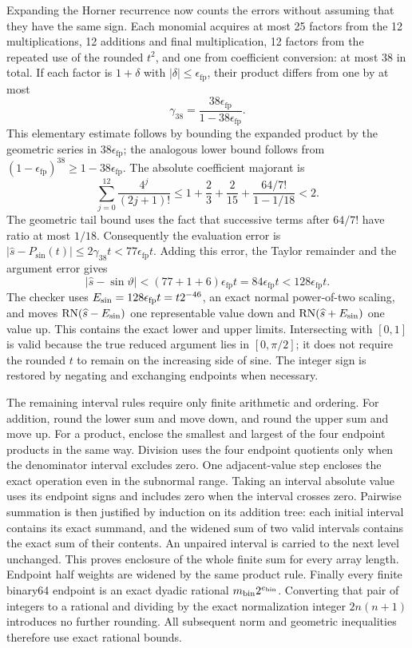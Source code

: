 Expanding the Horner recurrence now counts the errors without assuming
that they have the same sign. Each monomial acquires at most 25 factors
from the 12 multiplications, 12 additions and final multiplication,
12 factors from the repeated use of the rounded $t^2$, and one from
coefficient conversion: at most 38 in total. If each factor is
$1+\delta$ with $|\delta|\leq\epsilon_{\mathrm{fp}}$, their product
differs from one by at most
\[
 \gamma_{38}=\frac{38\epsilon_{\mathrm{fp}}}
                         {1-38\epsilon_{\mathrm{fp}}}.
\]
This elementary estimate follows by bounding the expanded product by
the geometric series in $38\epsilon_{\mathrm{fp}}$; the analogous
lower bound follows from $(1-\epsilon_{\mathrm{fp}})^{38}
\geq1-38\epsilon_{\mathrm{fp}}$. The absolute coefficient majorant is
\[
 \sum_{j=0}^{12}\frac{4^j}{(2j+1)!}
 \leq1+\frac23+\frac2{15}
           +\frac{64/7!}{1-1/18}<2.
\]
The geometric tail bound uses the fact that successive terms after
$64/7!$ have ratio at most $1/18$.
Consequently the evaluation error is
$|\widehat s-P_{\mathrm{sin}}(t)|\leq2\gamma_{38}t
<77\epsilon_{\mathrm{fp}}t$. Adding this error, the Taylor remainder
and the argument error gives
\[
 |\widehat s-\sin\vartheta|
 <(77+1+6)\epsilon_{\mathrm{fp}}t
 =84\epsilon_{\mathrm{fp}}t
 <128\epsilon_{\mathrm{fp}}t.
\]
The checker uses $E_{\rm sin}=128\epsilon_{\mathrm{fp}}t=t2^{-46}$, an exact
normal power-of-two scaling, and moves
$\operatorname{RN}(\widehat s-E_{\rm sin})$ one representable value down and
$\operatorname{RN}(\widehat s+E_{\rm sin})$ one value up. This contains the
exact lower and upper limits. Intersecting with $[0,1]$ is valid
because the true reduced argument lies in $[0,\pi/2]$; it does not
require the rounded $t$ to remain on the increasing side of sine.
The integer sign is restored by negating and exchanging endpoints
when necessary.

The remaining interval rules require only finite arithmetic and
ordering. For addition, round the lower sum and move down, and round
the upper sum and move up. For a product, enclose the smallest and
largest of the four endpoint products in the same way. Division uses
the four endpoint quotients only when the denominator interval excludes
zero. One adjacent-value step encloses the exact operation even in
the subnormal range. Taking an interval absolute value uses its endpoint
signs and includes zero when the interval crosses zero.
Pairwise summation is then justified by induction on its addition tree:
each initial interval contains its exact summand, and the widened sum
of two valid intervals contains the exact sum of their contents.
An unpaired interval is carried to the next level unchanged. This
proves enclosure of the whole finite sum for every array length.
Endpoint half weights are widened by the same product rule.
Finally every finite binary64 endpoint is an exact dyadic rational
$m_{\rm bin}2^{e_{\rm bin}}$. Converting that pair of integers to a rational and dividing
by the exact normalization integer $2n(n+1)$ introduces no further
rounding. All subsequent norm and geometric inequalities therefore
use exact rational bounds.

